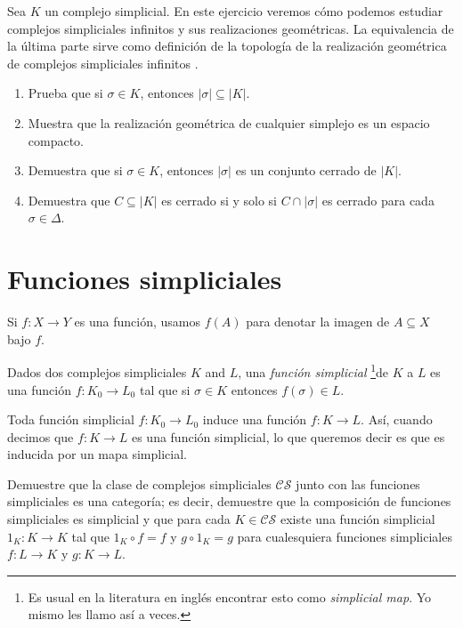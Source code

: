\documentclass{standalone}
\begin{document}
	\begin{exercise}\label{rem:geom_realization_colimit}
		Sea $K$ un complejo simplicial. En este ejercicio veremos cómo podemos estudiar complejos simpliciales infinitos y sus realizaciones geométricas. La equivalencia de la última parte sirve como definición de la topología de la realización geométrica de complejos simpliciales infinitos \cite[p. 8]{munkres:1984:algebraic:topology}.
		\begin{enumerate}
			\item Prueba que si $\sigma\in K$, entonces $|\sigma|\subseteq |K|$.
			\item Muestra que la realización geométrica de cualquier simplejo es un espacio compacto.
			\item Demuestra que si $\sigma\in K$, entonces $|\sigma|$ es un conjunto cerrado de $|K|$.
			\item Demuestra que $C\subseteq|K|$ es cerrado si y solo si $C\cap|\sigma|$ es cerrado para cada $\sigma\in\Delta$.
		\end{enumerate}
	\end{exercise}
	
	\section{Funciones simpliciales}
	\noindent Si $f\colon X\rightarrow Y$ es una función, usamos $f(A)$ para denotar la imagen de $A\subseteq X$ bajo $f$.
	\begin{definition}\label{def:simplicial_map}
		Dados dos complejos simpliciales $K$ and $L$, una \emph{función simplicial} \footnote{Es usual en la literatura en inglés encontrar esto como \emph{simplicial map}. Yo mismo les llamo así a veces.}de $K$ a $L$ es una función $f\colon K_{0}\rightarrow L_{0}$ tal que si $\sigma\in K$ entonces $f(\sigma)\in L$.
	\end{definition}
	\begin{remark}
		Toda función simplicial $f\colon K_{0}\rightarrow L_{0}$ induce una función $f\colon K\rightarrow L$. Así, cuando decimos que $f\colon K\rightarrow L$ es una función simplicial, lo que queremos decir es que es inducida por un mapa simplicial. 
	\end{remark}
	
	\begin{exercise}
		Demuestre que la clase de complejos simpliciales $\mathcal{CS}$ junto con las funciones simpliciales es una categoría; es decir, demuestre que la composición de funciones simpliciales es simplicial y que para cada $K\in\mathcal{CS}$ existe una función simplicial $1_{K} \colon K\rightarrow K$ tal que $1_{K}\circ f = f$ y $g\circ 1_{K} = g$ para cualesquiera funciones simpliciales $f\colon L\rightarrow K$ y $g\colon K\rightarrow L$.
	\end{exercise}
	
\end{document}
